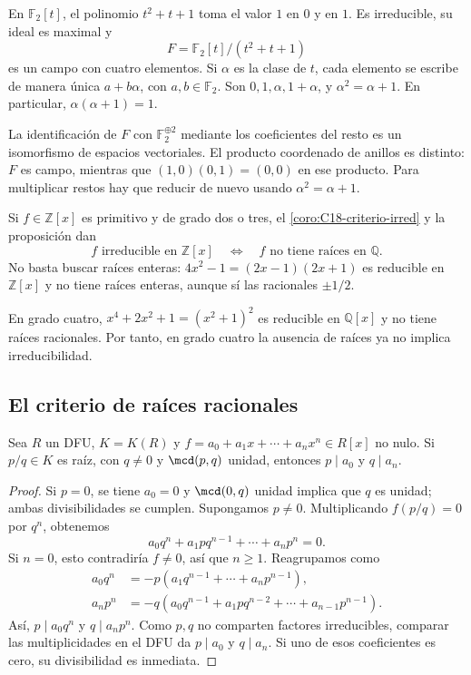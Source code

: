 \begin{ejem}
En $\mathbb F_2[t]$, el polinomio $t^2+t+1$ toma el valor $1$ en $0$ y en $1$. Es irreducible, su ideal es maximal y
\[
F=\mathbb F_2[t]/(t^2+t+1)
\]
es un campo con cuatro elementos. Si $\alpha$ es la clase de $t$, cada elemento se escribe de manera única $a+b\alpha$, con $a,b\in\mathbb F_2$. Son $0,1,\alpha,1+\alpha$, y $\alpha^2=\alpha+1$. En particular, $\alpha(\alpha+1)=1$.
\end{ejem}
\begin{obs}
La identificación de $F$ con $\mathbb F_2^{\oplus2}$ mediante los coeficientes del resto es un isomorfismo de espacios vectoriales. El producto coordenado de anillos es distinto: $F$ es campo, mientras que $(1,0)(0,1)=(0,0)$ en ese producto. Para multiplicar restos hay que reducir de nuevo usando $\alpha^2=\alpha+1$.
\end{obs}

\begin{ejem}
Si $f\in\mathbb Z[x]$ es primitivo y de grado dos o tres, el \cref{coro:C18-criterio-irred} y la proposición dan
\[
f\text{ irreducible en }\mathbb Z[x]
\quad\Longleftrightarrow\quad
f\text{ no tiene raíces en }\mathbb Q.
\]
No basta buscar raíces enteras: $4x^2-1=(2x-1)(2x+1)$ es reducible en $\mathbb Z[x]$ y no tiene raíces enteras, aunque sí las racionales $\pm1/2$.

En grado cuatro, $x^4+2x^2+1=(x^2+1)^2$ es reducible en $\mathbb Q[x]$ y no tiene raíces racionales. Por tanto, en grado cuatro la ausencia de raíces ya no implica irreducibilidad.
\end{ejem}

\subsection{El criterio de raíces racionales}
\begin{prop}\label{prop:C19-raices-racionales}
Sea $R$ un DFU, $K=K(R)$ y $f=a_0+a_1x+\cdots+a_nx^n\in R[x]$ no nulo. Si $p/q\in K$ es raíz, con $q\ne0$ y $\mcd(p,q)$ unidad, entonces $p\mid a_0$ y $q\mid a_n$.
\end{prop}
\begin{proof}
Si $p=0$, se tiene $a_0=0$ y $\mcd(0,q)$ unidad implica que $q$ es unidad; ambas divisibilidades se cumplen. Supongamos $p\ne0$. Multiplicando $f(p/q)=0$ por $q^n$, obtenemos
\[
a_0q^n+a_1pq^{n-1}+\cdots+a_np^n=0.
\]
Si $n=0$, esto contradiría $f\ne0$, así que $n\geq1$. Reagrupamos como
\[
\begin{aligned}
a_0q^n&=-p(a_1q^{n-1}+\cdots+a_np^{n-1}),\\
a_np^n&=-q(a_0q^{n-1}+a_1pq^{n-2}+\cdots+a_{n-1}p^{n-1}).
\end{aligned}
\]
Así, $p\mid a_0q^n$ y $q\mid a_np^n$. Como $p,q$ no comparten factores irreducibles, comparar las multiplicidades en el DFU da $p\mid a_0$ y $q\mid a_n$. Si uno de esos coeficientes es cero, su divisibilidad es inmediata.
\end{proof}

